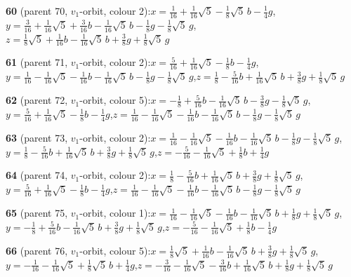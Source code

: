 \documentclass[10pt]{article}
\begin{document}
{\noindent\textbf{60} (parent 70, $v_1$-orbit, colour 2):\quad $x=\tfrac{1}{16}+\tfrac{1}{16}\sqrt5-\tfrac{1}{8}\sqrt5\,b-\tfrac{1}{4}g$,\quad $y=\tfrac{3}{16}+\tfrac{1}{16}\sqrt5+\tfrac{3}{16}b-\tfrac{1}{16}\sqrt5\,b-\tfrac{1}{8}g-\tfrac{1}{8}\sqrt5\,g$,\quad $z=\tfrac{1}{8}\sqrt5+\tfrac{1}{16}b-\tfrac{1}{16}\sqrt5\,b+\tfrac{3}{8}g+\tfrac{1}{8}\sqrt5\,g$\par\smallskip
\noindent\textbf{61} (parent 71, $v_1$-orbit, colour 2):\quad $x=\tfrac{5}{16}+\tfrac{1}{16}\sqrt5-\tfrac{1}{8}b-\tfrac{1}{4}g$,\quad $y=\tfrac{1}{16}-\tfrac{1}{16}\sqrt5-\tfrac{1}{16}b-\tfrac{1}{16}\sqrt5\,b-\tfrac{1}{8}g-\tfrac{1}{8}\sqrt5\,g$,\quad $z=\tfrac{1}{8}-\tfrac{5}{16}b+\tfrac{1}{16}\sqrt5\,b+\tfrac{3}{8}g+\tfrac{1}{8}\sqrt5\,g$\par\smallskip
\noindent\textbf{62} (parent 72, $v_1$-orbit, colour 5):\quad $x=-\tfrac{1}{8}+\tfrac{5}{16}b-\tfrac{1}{16}\sqrt5\,b-\tfrac{3}{8}g-\tfrac{1}{8}\sqrt5\,g$,\quad $y=\tfrac{5}{16}+\tfrac{1}{16}\sqrt5-\tfrac{1}{8}b-\tfrac{1}{4}g$,\quad $z=\tfrac{1}{16}-\tfrac{1}{16}\sqrt5-\tfrac{1}{16}b-\tfrac{1}{16}\sqrt5\,b-\tfrac{1}{8}g-\tfrac{1}{8}\sqrt5\,g$\par\smallskip
\noindent\textbf{63} (parent 73, $v_1$-orbit, colour 2):\quad $x=\tfrac{1}{16}-\tfrac{1}{16}\sqrt5-\tfrac{1}{16}b-\tfrac{1}{16}\sqrt5\,b-\tfrac{1}{8}g-\tfrac{1}{8}\sqrt5\,g$,\quad $y=\tfrac{1}{8}-\tfrac{5}{16}b+\tfrac{1}{16}\sqrt5\,b+\tfrac{3}{8}g+\tfrac{1}{8}\sqrt5\,g$,\quad $z=-\tfrac{5}{16}-\tfrac{1}{16}\sqrt5+\tfrac{1}{8}b+\tfrac{1}{4}g$\par\smallskip
\noindent\textbf{64} (parent 74, $v_1$-orbit, colour 2):\quad $x=\tfrac{1}{8}-\tfrac{5}{16}b+\tfrac{1}{16}\sqrt5\,b+\tfrac{3}{8}g+\tfrac{1}{8}\sqrt5\,g$,\quad $y=\tfrac{5}{16}+\tfrac{1}{16}\sqrt5-\tfrac{1}{8}b-\tfrac{1}{4}g$,\quad $z=\tfrac{1}{16}-\tfrac{1}{16}\sqrt5-\tfrac{1}{16}b-\tfrac{1}{16}\sqrt5\,b-\tfrac{1}{8}g-\tfrac{1}{8}\sqrt5\,g$\par\smallskip
\noindent\textbf{65} (parent 75, $v_1$-orbit, colour 1):\quad $x=\tfrac{1}{16}-\tfrac{1}{16}\sqrt5-\tfrac{1}{16}b-\tfrac{1}{16}\sqrt5\,b+\tfrac{1}{8}g+\tfrac{1}{8}\sqrt5\,g$,\quad $y=-\tfrac{1}{8}+\tfrac{5}{16}b-\tfrac{1}{16}\sqrt5\,b+\tfrac{3}{8}g+\tfrac{1}{8}\sqrt5\,g$,\quad $z=-\tfrac{5}{16}-\tfrac{1}{16}\sqrt5+\tfrac{1}{8}b-\tfrac{1}{4}g$\par\smallskip
\noindent\textbf{66} (parent 76, $v_1$-orbit, colour 5):\quad $x=\tfrac{1}{8}\sqrt5+\tfrac{1}{16}b-\tfrac{1}{16}\sqrt5\,b+\tfrac{3}{8}g+\tfrac{1}{8}\sqrt5\,g$,\quad $y=-\tfrac{1}{16}-\tfrac{1}{16}\sqrt5+\tfrac{1}{8}\sqrt5\,b+\tfrac{1}{4}g$,\quad $z=-\tfrac{3}{16}-\tfrac{1}{16}\sqrt5-\tfrac{3}{16}b+\tfrac{1}{16}\sqrt5\,b+\tfrac{1}{8}g+\tfrac{1}{8}\sqrt5\,g$\par\smallskip
}
\end{document}
